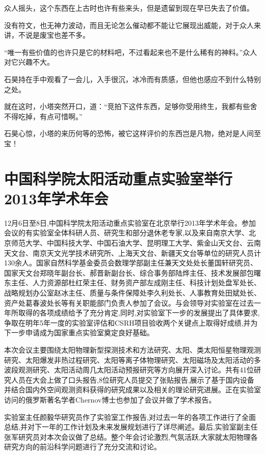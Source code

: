 众人摇头，这个东西在上古时也许有些来头，但是遗留到现在早已失去了价值。

没有符文，也无神力波动，而且无论怎么催动都不能让它展现出威能，对于众人来讲，不说是废宝也差不多。

“唯一有些价值的也许只是它的材料吧，不过看起来也不是什么稀有的神料。”众人对它兴趣不大。

石昊持在手中观看了一会儿，入手很沉，冰冷而有质感，但他也感应不到什么特别之处。

就在这时，小塔突然开口，道：“竞拍下这件东西，足够你受用终生，我都有些舍不得吃掉，有点可惜啊。”

石昊心惊，小塔的来历何等的恐怖，被它这样评价的东西岂是凡物，绝对是人间至宝！

\chapter{中国科学院太阳活动重点实验室举行2013年学术年会}

12月6日至8日,中国科学院太阳活动重点实验室在北京举行2013年学术年会。参加会议的有实验室全体科研人员、研究生和部分退休老专家,以及来自南京大学、北京师范大学、中国科技大学、中国石油大学、昆明理工大学、紫金山天文台、云南天文台、南京天文光学技术研究所、上海天文台、新疆天文台等单位的研究人员计130余人。国家自然科学基金委员会数理学部副主任兼天文处处长董国轩研究员、国家天文台郑晓年副台长、郝晋新副台长、综合事务部陆烨主任、技术发展部包曙东主任、人力资源部杜红荣主任、财务资产部左成刚主任、科技计划处盘军处长、战略规划办公室赵冰主任、质量与条件保障处李久利处长、人事教育处田斌处长、资产处葛春波处长等有关职能部门负责人参加了会议。与会领导对实验室在过去一年所取得的各项成绩给予了充分肯定,同时,对实验室下一步的发展提出了具体要求,争取在明年5年一度的实验室评估和CSRH项目验收两个关键点上取得好成绩,并为下一步申请成为国家重点实验室奠定良好基础。 

本次会议主要围绕太阳物理新型探测技术和方法研究、太阳、类太阳恒星物理观测研究、太阳爆发非热过程研究、太阳等离子体物理研究、太阳磁场及太阳活动的多波段观测研究、太阳活动周几太阳活动预报研究等方向展开深入讨论。共有41位研究人员在大会上做了口头报告,8位研究人员提交了张贴报告,展示了基于国内设备并结合国内外空间观测资料获得的研究成果以及相关的理论研究进展。正在实验室访问的俄罗斯著名学者Chernov博士也参加了会议并做了学术报告。 

实验室主任颜毅华研究员作了实验室工作报告,对过去一年的各项工作进行了全面总结,并对下一年的工作计划及未来发展规划进行了详尽阐述。最后,实验室副主任张军研究员对本次会议做了总结。整个年会讨论激烈,气氛活跃,大家就太阳物理各研究方向的前沿科学问题进行了充分交流和讨论。